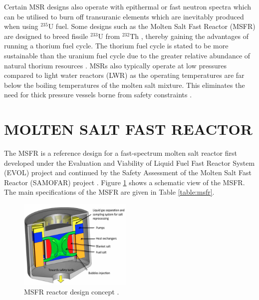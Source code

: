 \documentclass{anstrans}
\begin{document}
Certain MSR designs also operate with epithermal or fast neutron spectra which can be utilised to burn off transuranic elements which are inevitably produced when using $^{235}$U fuel. Some designs such as the Molten Salt Fast Reactor (MSFR) are designed to breed fissile $^{233}$U from $^{232}$Th \cite{serp_molten_2014}, thereby gaining the advantages of running a thorium fuel cycle. The thorium fuel cycle is stated to be more sustainable than the uranium fuel cycle due to the greater relative abundance of natural thorium resources \cite{iaea_thorium_2005}. MSRs also typically operate at low pressures compared to light water reactors (LWR) as the operating temperatures are far below the boiling temperatures of the molten salt mixture. This eliminates the need for thick pressure vessels borne from safety constraints \cite{elsheikh_safety_2013}.

\section{MOLTEN SALT FAST REACTOR}

The MSFR is a reference design for a fast-spectrum molten salt reactor first developed under the Evaluation and Viability of Liquid Fuel Fast Reactor System (EVOL) project and continued by the Safety Assessment of the Molten Salt Fast Reactor (SAMOFAR) project \cite{serp_molten_2014}. Figure \ref{fig:msfr} shows a schematic view of the MSFR. The main specifications of the MSFR are given in Table \ref{table:msfr}.

\begin{figure}[t] 
	\centering
	\includegraphics[width=0.48\textwidth]{./figures/MSFR}
	\caption{MSFR reactor design concept \cite{serp_molten_2014}.}
	\label{fig:msfr}
\end{figure} 
\end{document}

